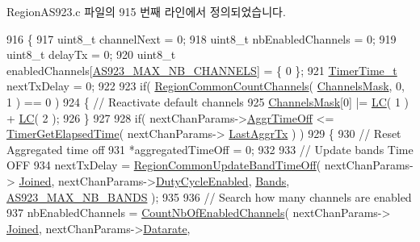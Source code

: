Region\+A\+S923.\+c 파일의 915 번째 라인에서 정의되었습니다.


\begin{DoxyCode}
916 \{
917     uint8\_t channelNext = 0;
918     uint8\_t nbEnabledChannels = 0;
919     uint8\_t delayTx = 0;
920     uint8\_t enabledChannels[\mbox{\hyperlink{group___r_e_g_i_o_n_a_s923_ga02e3db7e4557dbf77db79285d38dc33e}{AS923\_MAX\_NB\_CHANNELS}}] = \{ 0 \};
921     \mbox{\hyperlink{utilities_8h_a4215ca43d3e953099ea758ce428599d0}{TimerTime\_t}} nextTxDelay = 0;
922 
923     \textcolor{keywordflow}{if}( \mbox{\hyperlink{group___r_e_g_i_o_n_c_o_m_m_o_n_gac23f0831812f610f57f42f6cf87368c9}{RegionCommonCountChannels}}( \mbox{\hyperlink{_region_a_s923_8c_a2188957b5ca6af8092154d7ccbfa5757}{ChannelsMask}}, 0, 1 ) == 0 )
924     \{ \textcolor{comment}{// Reactivate default channels}
925         \mbox{\hyperlink{_region_a_s923_8c_a2188957b5ca6af8092154d7ccbfa5757}{ChannelsMask}}[0] |= \mbox{\hyperlink{group___r_e_g_i_o_n_ga12fa17e5c1016e01a9d82c25027deb1b}{LC}}( 1 ) + \mbox{\hyperlink{group___r_e_g_i_o_n_ga12fa17e5c1016e01a9d82c25027deb1b}{LC}}( 2 );
926     \}
927 
928     \textcolor{keywordflow}{if}( nextChanParams->\mbox{\hyperlink{structs_next_chan_params_a3609676d2d3b7c00e25615324b35cb26}{AggrTimeOff}} <= \mbox{\hyperlink{time_server_8c_a9ca7e27f3d6474daff63f2e093a2e91e}{TimerGetElapsedTime}}( nextChanParams->
      \mbox{\hyperlink{structs_next_chan_params_a381b728f60b185ecf3313e974c18768b}{LastAggrTx}} ) )
929     \{
930         \textcolor{comment}{// Reset Aggregated time off}
931         *aggregatedTimeOff = 0;
932 
933         \textcolor{comment}{// Update bands Time OFF}
934         nextTxDelay = \mbox{\hyperlink{group___r_e_g_i_o_n_c_o_m_m_o_n_ga2e26fe6b49ca26edf7052eadd7f18b3a}{RegionCommonUpdateBandTimeOff}}( nextChanParams->
      \mbox{\hyperlink{structs_next_chan_params_ac2f6caa0f3b02d2ac5056c3ee7c22652}{Joined}}, nextChanParams->\mbox{\hyperlink{structs_next_chan_params_a4d755868e0e80089462286c3ba6a6f18}{DutyCycleEnabled}}, \mbox{\hyperlink{_region_a_s923_8c_a0b72a92a2d2766ee7cbc3ae162996cbf}{Bands}}, 
      \mbox{\hyperlink{group___r_e_g_i_o_n_a_s923_ga462d2371d2b936331d37530925ffb66d}{AS923\_MAX\_NB\_BANDS}} );
935 
936         \textcolor{comment}{// Search how many channels are enabled}
937         nbEnabledChannels = \mbox{\hyperlink{_region_a_s923_8c_a84ed01aa0ea6f1e53707efb5aaa3bd97}{CountNbOfEnabledChannels}}( nextChanParams->
      \mbox{\hyperlink{structs_next_chan_params_ac2f6caa0f3b02d2ac5056c3ee7c22652}{Joined}}, nextChanParams->\mbox{\hyperlink{structs_next_chan_params_ae2f6080f3aa0e9485c55513ca56bb24d}{Datarate}},

\end{DoxyCode}
